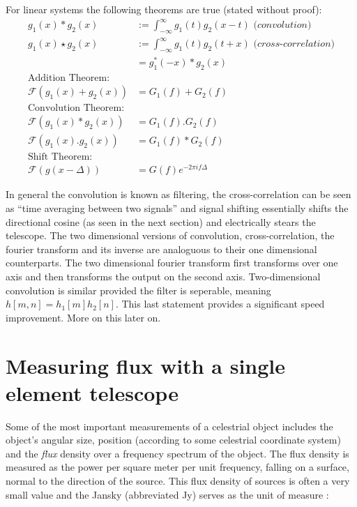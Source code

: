 \documentclass[a4paper,10pt]{report}
\begin{document}
For linear systems the following theorems are true (stated without proof):
\begin{equation*}
  \begin{split}
    g_1(x)*g_2(x) &:= \int_{-\infty}^{\infty}g_1(t)g_2(x-t)\textit{ (convolution)}\\
    g_1(x)\star g_2(x) &:= \int_{-\infty}^{\infty}g_1(t)g_2(t+x)\textit{ (cross-correlation)}\\
    &=g_1^*(-x)*g_2(x)\\
    \text{Addition Theorem:}\\
    \mathcal{F}(g_1(x)+g_2(x)) &= G_1(f)+G_2(f)\\
    \text{Convolution Theorem:}\\
    \mathcal{F}(g_1(x)*g_2(x)) &=G_1(f).G_2(f)\\
    \mathcal{F}(g_1(x).g_2(x)) &=G_1(f)*G_2(f)\\
    \text{Shift Theorem:}\\
    \mathcal{F}(g(x-\Delta))&=G(f)e^{-2\pi if\Delta}
  \end{split}
\end{equation*}

In general the convolution is known as filtering, the cross-correlation can be seen as ``time averaging between two signals'' and signal shifting essentially shifts the directional cosine (as seen in the next section) and electrically
stears the telescope. The two dimensional versions of convolution, cross-correlation, the fourier transform and its inverse are analoguous to their one dimensional counterparts. The two dimensional fourier transform first transforms
over one axis and then transforms the output on the second axis. Two-dimensional convolution is similar provided the filter is seperable, meaning $h[m,n]=h_1[m]h_2[n]$. This last statement provides a significant speed improvement. More 
on this later on.
\section{Measuring flux with a single element telescope}
Some of the most important measurements of a celestrial object includes the object's angular size, position (according to some celestrial coordinate system) and the \textit{flux} density over a 
frequency spectrum of the object. The flux density is measured as the power per square meter per unit frequency, falling on a surface, normal to the direction of the source. This flux 
density of sources is often a very small value and the Jansky (abbreviated Jy) serves as the unit of measure \cite{christiansenradiotelescopes,wilson2009tools}:
\end{document}
